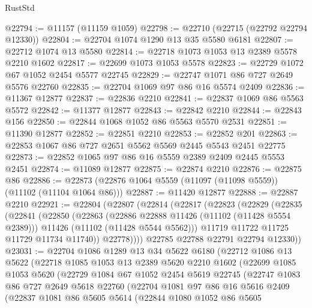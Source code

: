 \begin{lexlean}{RustStd}
\begin{coremodule}
@22794 := @11157 (@11159 @1059)
@22798 := @22710 (@22715 (@22792 @22794 @12330))
@22804 := @22704 @1074 @1290 @13 @35 @5580 @6181
@22807 := @22712 @1074 @13 @5580
@22814 := @22718 @1073 @1053 @13 @2389 @5578 @2210 @1602
@22817 := @22699 @1073 @1053 @5578
@22823 := @22729 @1072 @67 @1052 @2454 @5577 @22745
@22829 := @22747 @1071 @86 @727 @2649 @5576 @22760
@22835 := @22704 @1069 @97 @86 @16 @5574 @2409
@22836 := @11367 @12877
@22837 := @22836 @2210
@22841 := @22837 @1069 @86 @5563 @5572
@22842 := @11377 @12877
@22843 := @22842 @2210
@22844 := @22843 @156
@22850 := @22844 @1068 @1052 @86 @5563 @5570 @2531
@22851 := @11390 @12877
@22852 := @22851 @2210
@22853 := @22852 @201
@22863 := @22853 @1067 @86 @727 @2651 @5562 @5569 @2445 @5543 @2451 @22775
@22873 := @22852 @1065 @97 @86 @16 @5559 @2389 @2409 @2445 @5553 @2451
@22874 := @11089 @12877
@22875 := @22874 @2210
@22876 := @22875 @86
@22886 := @22873 (@22876 @1064 @5559 (@11097 (@11098 @5559)) (@11102 (@11104 @1064 @86)))
@22887 := @11420 @12877
@22888 := @22887 @2210
@22921 := @22804
    (@22807
      (@22814
        (@22817
          (@22823
            (@22829
              (@22835
                (@22841
                  (@22850
                    (@22863
                      (@22886 @22888 @11426 (@11102 (@11428 @5554 @2389)))
                      @11426
                      (@11102 (@11428 @5544 @5562)))
                    @11719
                    @11722
                    @11725
                    @11729
                    @11734
                    @11740))
                @22778))))
        @22785
        @22788
        @22791
        @22794
        @12330))
@23031 := @22704
    @1086
    @1289
    @13
    @34
    @5622
    @6180
    (@22712
      @1086
      @13
      @5622
      (@22718
        @1085
        @1053
        @13
        @2389
        @5620
        @2210
        @1602
        (@22699
          @1085
          @1053
          @5620
          (@22729
            @1084
            @67
            @1052
            @2454
            @5619
            @22745
            (@22747
              @1083
              @86
              @727
              @2649
              @5618
              @22760
              (@22704
                @1081
                @97
                @86
                @16
                @5616
                @2409
                (@22837
                  @1081
                  @86
                  @5605
                  @5614
                  (@22844
                    @1080
                    @1052
                    @86
                    @5605

\end{coremodule}
\end{lexlean}

